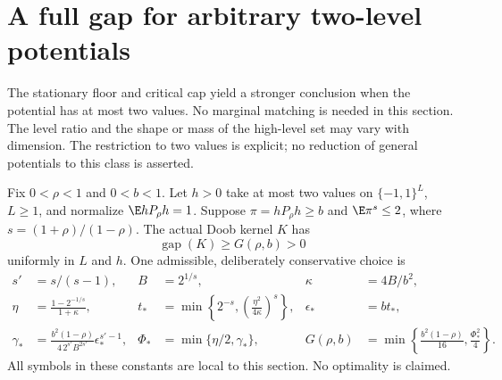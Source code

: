 \section{A full gap for arbitrary two-level potentials}\label{twolevelgap}
The stationary floor and critical cap yield a stronger conclusion when the
potential has at most two values. No marginal matching is needed in this
section. The level ratio and the shape or mass of the high-level set may
vary with dimension. The restriction to two values is explicit; no reduction
of general potentials to this class is asserted.

\begin{theorem}\label{twolevelfullgap}
Fix $0<\rho<1$ and $0<b<1$. Let $h>0$ take at most two values on
$\{-1,1\}^L$, $L\geq1$, and normalize $\E hP_\rho h=1$. Suppose
$\pi=hP_\rho h\geq b$ and $\E\pi^s\leq2$, where
$s=(1+\rho)/(1-\rho)$. The actual Doob kernel $K$ has
\[
 \operatorname{gap}(K)\geq G(\rho,b)>0
\]
uniformly in $L$ and $h$. One admissible, deliberately conservative choice is
\begin{align*}
 s'&=s/(s-1), & B&=2^{1/s}, & \kappa&=4B/b^2,\\
 \eta&=\frac{1-2^{-1/s}}{1+\kappa}, &
 t_*&=\min\left\{2^{-s},\left(\frac{\eta^2}{4\kappa}\right)^s\right\}, &
 \epsilon_*&=bt_*,\\
 \gamma_*&=\frac{b^2(1-\rho)}{4\,2^{s'}B^{2s'}}
                 \epsilon_*^{s'-1}, &
 \Phi_*&=\min\{\eta/2,\gamma_*\}, &
 G(\rho,b)&=\min\left\{\frac{b^2(1-\rho)}{16},\frac{\Phi_*^2}{4}\right\}.
\end{align*}
All symbols in these constants are local to this section. No optimality is
claimed.
\end{theorem}
